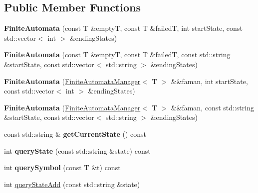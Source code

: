 \subsection*{Public Member Functions}
\begin{DoxyCompactItemize}
\item 
\mbox{\label{classx2_1_1_finite_automata_a7ab5a598af5fe719caccb661c71829d6}} 
{\bfseries Finite\+Automata} (const T \&emptyT, const T \&failedT, int start\+State, const std\+::vector$<$ int $>$ \&ending\+States)
\item 
\mbox{\label{classx2_1_1_finite_automata_a1a9802db45527e15f561af9b6e8c8af7}} 
{\bfseries Finite\+Automata} (const T \&emptyT, const T \&failedT, const std\+::string \&start\+State, const std\+::vector$<$ std\+::string $>$ \&ending\+States)
\item 
\mbox{\label{classx2_1_1_finite_automata_aace90dedecd2d57a9a058801c608aa9a}} 
{\bfseries Finite\+Automata} (\hyperlink{classx2_1_1_finite_automata_manager}{Finite\+Automata\+Manager}$<$ T $>$ \&\&faman, int start\+State, const std\+::vector$<$ int $>$ \&ending\+States)
\item 
\mbox{\label{classx2_1_1_finite_automata_a3a32bbd929198b40ad1a829cb5e1677c}} 
{\bfseries Finite\+Automata} (\hyperlink{classx2_1_1_finite_automata_manager}{Finite\+Automata\+Manager}$<$ T $>$ \&\&faman, const std\+::string \&start\+State, const std\+::vector$<$ std\+::string $>$ \&ending\+States)
\item 
\mbox{\label{classx2_1_1_finite_automata_a1c7905401495f3496476c49ba2a22760}} 
const std\+::string \& {\bfseries get\+Current\+State} () const
\item 
\mbox{\label{classx2_1_1_finite_automata_a23c483414a3639840cf6697615852512}} 
int {\bfseries query\+State} (const std\+::string \&state) const
\item 
\mbox{\label{classx2_1_1_finite_automata_a85ff5c6205df2affc904cce0765050a7}} 
int {\bfseries query\+Symbol} (const T \&t) const
\item 
int \hyperlink{classx2_1_1_finite_automata_a44ca86f1589eeaa77ab73f953033c5a5}{query\+State\+Add} (const std\+::string \&state)

\end{DoxyCompactItemize}
